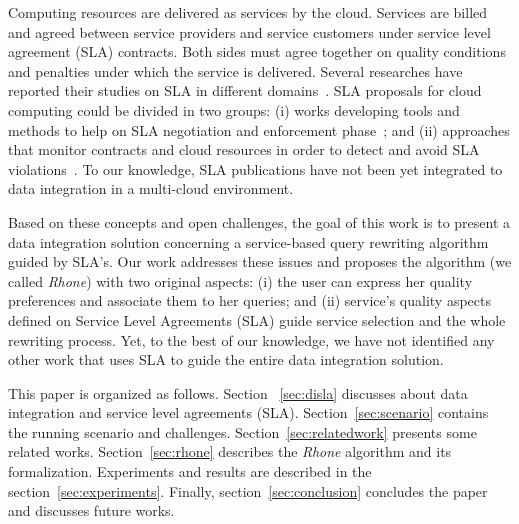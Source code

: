 Computing resources are delivered as services by the cloud. Services are billed and agreed between service providers and service customers under service level agreement (SLA) contracts.
Both sides must agree together on quality conditions and penalties under which the service is delivered. 
Several researches have reported their studies on SLA in different domains~\cite{AlhamadDC11}.
SLA proposals for cloud computing could be divided in two groups: (i) works developing tools and methods to help on SLA negotiation and enforcement phase~\cite{rak2013,Mavrogeorgi2013}; and (ii) approaches that monitor contracts and cloud resources in order to detect and avoid SLA violations~\cite{Leitner2010,Maarouf2015}. To our knowledge, SLA publications have not been yet integrated to data integration in a multi-cloud environment.

Based on these concepts and open challenges, the goal of this work is to present
a data integration solution concerning a service-based query rewriting algorithm guided by SLA's.
Our work addresses these issues and proposes the algorithm (we
called \textit{Rhone}) with two original aspects: (i) the user can express her
quality preferences and associate them to her queries; and (ii)  service's quality aspects defined on Service Level Agreements (SLA) guide service selection and the whole rewriting process.
Yet, to the best of our knowledge, we have not identified any other work that uses SLA to guide the entire data integration solution.

This paper is organized as follows. Section ~\ref{sec:disla} discusses
about data integration and service level agreements (SLA).
Section~\ref{sec:scenario} contains the running scenario and challenges.
Section~\ref{sec:relatedwork} presents some related works.
Section~\ref{sec:rhone} describes the \textit{Rhone} algorithm and its
formalization.
Experiments and results are described in the section~\ref{sec:experiments}. 
Finally, section~\ref{sec:conclusion} concludes the paper and discusses future works.

